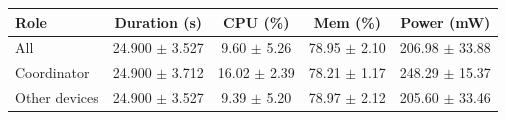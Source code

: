\begin{tabular}{lcccc}
\hline
\textbf{Role} & \textbf{Duration (s)} & \textbf{CPU (\%)} & \textbf{Mem (\%)} & \textbf{Power (mW)} \\
\hline
All & 24.900 $\pm$ 3.527 & 9.60 $\pm$ 5.26 & 78.95 $\pm$ 2.10 & 206.98 $\pm$ 33.88 \\
Coordinator & 24.900 $\pm$ 3.712 & 16.02 $\pm$ 2.39 & 78.21 $\pm$ 1.17 & 248.29 $\pm$ 15.37 \\
Other devices & 24.900 $\pm$ 3.527 & 9.39 $\pm$ 5.20 & 78.97 $\pm$ 2.12 & 205.60 $\pm$ 33.46 \\
\hline
\end{tabular}
